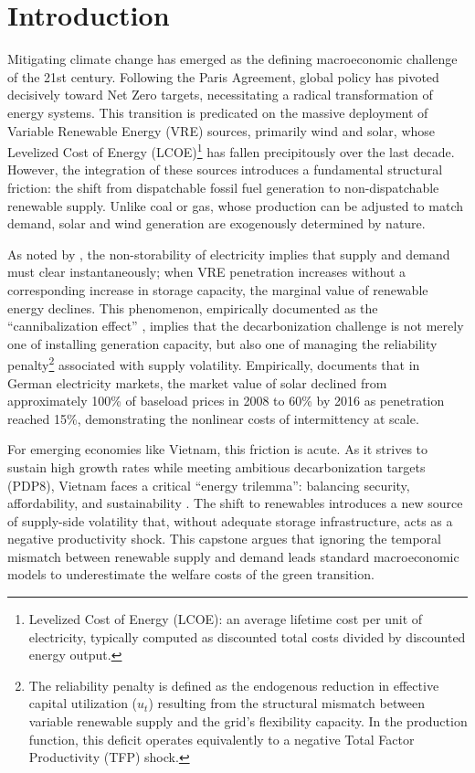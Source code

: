 \documentclass[12pt, a4paper]{article}
\begin{document}
	\clearpage
	\section{Introduction}
	
	Mitigating climate change has emerged as the defining macroeconomic challenge of the 21st century. Following the Paris Agreement, global policy has pivoted decisively toward Net Zero targets, necessitating a radical transformation of energy systems. This transition is predicated on the massive deployment of Variable Renewable Energy (VRE) sources, primarily wind and solar, whose Levelized Cost of Energy (LCOE)\footnote{Levelized Cost of Energy (LCOE): an average lifetime cost per unit of electricity, typically computed as discounted total costs divided by discounted energy output.} has fallen precipitously over the last decade. However, the integration of these sources introduces a fundamental structural friction: the shift from dispatchable fossil fuel generation to non-dispatchable renewable supply. Unlike coal or gas, whose production can be adjusted to match demand, solar and wind generation are exogenously determined by nature.
	
	As noted by \citet{ambec2012}, the non-storability of electricity implies that supply and demand must clear instantaneously; when VRE penetration increases without a corresponding increase in storage capacity, the marginal value of renewable energy declines. This phenomenon, empirically documented as the ``cannibalization effect'' \citep{hirth2013}, implies that the decarbonization challenge is not merely one of installing generation capacity, but also one of managing the reliability penalty\footnote{The reliability penalty is defined as the endogenous reduction in effective capital utilization ($u_t$) resulting from the structural mismatch between variable renewable supply and the grid's flexibility capacity. In the production function, this deficit operates equivalently to a negative Total Factor Productivity (TFP) shock.} associated with supply volatility. Empirically, \citet{hirth2013} documents that in German electricity markets, the market value of solar declined from approximately 100\% of baseload prices in 2008 to 60\% by 2016 as penetration reached 15\%, demonstrating the nonlinear costs of intermittency at scale.
	
	For emerging economies like Vietnam, this friction is acute. As it strives to sustain high growth rates while meeting ambitious decarbonization targets (PDP8), Vietnam faces a critical ``energy trilemma'': balancing security, affordability, and sustainability \citep{liu2022Roles}. The shift to renewables introduces a new source of supply-side volatility that, without adequate storage infrastructure, acts as a negative productivity shock. This capstone argues that ignoring the temporal mismatch between renewable supply and demand leads standard macroeconomic models to underestimate the welfare costs of the green transition.
	
\end{document}

